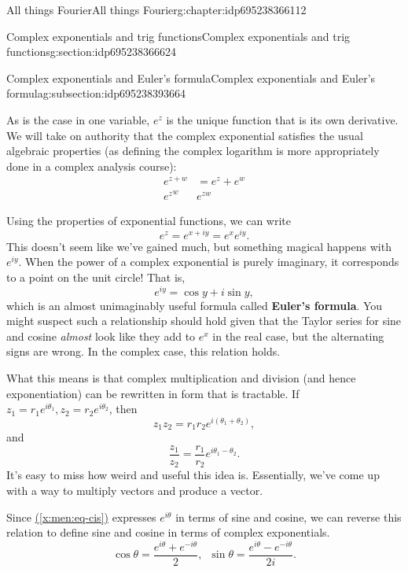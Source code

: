 \documentclass[oneside,10pt,]{book}
\newcommand{\xreffont}{\relax}
\newcommand{\terminology}[1]{\textbf{#1}}
\numberwithin{equation}{section}
\numberwithin{equation}{section}
\newcommand{\amp}{&}
\begin{document}
\begin{chapterptx}{All things Fourier}{}{All things Fourier}{}{}{g:chapter:idp695238366112}
\begin{sectionptx}{Complex exponentials and trig functions}{}{Complex exponentials and trig functions}{}{}{g:section:idp695238366624}
\begin{subsectionptx}{Complex exponentials and Euler's formula}{}{Complex exponentials and Euler's formula}{}{}{g:subsection:idp695238393664}
\begin{equation*}
\end{equation*}
%
\par
As is the case in one variable, \(e^z\) is the unique function that is its own derivative. We will take on authority that the complex exponential satisfies the usual algebraic properties (as defining the complex logarithm is more appropriately done in a complex analysis course):%
\begin{align*}
e^{z + w} \amp= e^z + e^w\\
{e^z}^w \amp e^{zw}
\end{align*}
%
\par
Using the properties of exponential functions, we can write%
\begin{equation*}
e^z = e^{x + iy} = e^x e^{iy}.
\end{equation*}
This doesn't seem like we've gained much, but something magical happens with \(e^{iy}\). When the power of a complex exponential is purely imaginary, it corresponds to a point on the unit circle! That is,%
\begin{equation}
e^{iy} = \cos y + i \sin y,\label{x:men:eq-cis}
\end{equation}
which is an almost unimaginably useful formula called \terminology{Euler's formula}. You might suspect such a relationship should hold given that the Taylor series for sine and cosine \emph{almost} look like they add to \(e^x\) in the real case, but the alternating signs are wrong. In the complex case, this relation holds.%
\par
What this means is that complex multiplication and division (and hence exponentiation) can be rewritten in form that is tractable. If \(z_1 = r_1 e^{i\theta_1}, z_2 = r_2 e^{i\theta_2}\), then%
\begin{equation*}
z_1 z_2 = r_1 r_2 e^{i(\theta_1 + \theta_2)},
\end{equation*}
and%
\begin{equation*}
\frac{z_1}{z_2} = \frac{r_1}{r_2} e^{i \theta_1 - \theta_2}.
\end{equation*}
It's easy to miss how weird and useful this idea is. Essentially, we've come up with a way to multiply vectors and produce a vector.%
\par
Since \hyperref[x:men:eq-cis]{({\xreffont\ref{x:men:eq-cis}})} expresses \(e^{i\theta}\) in terms of sine and cosine, we can reverse this relation to define sine and cosine in terms of complex exponentials.%
\begin{equation*}
\cos \theta = \frac{e^{i\theta} + e^{-i\theta}}{2}, \,\,\, \sin \theta = \frac{e^{i\theta} - e^{-i\theta}}{2i}.

\end{equation*}
\end{subsectionptx}
\end{sectionptx}
\end{chapterptx}
\end{document}
